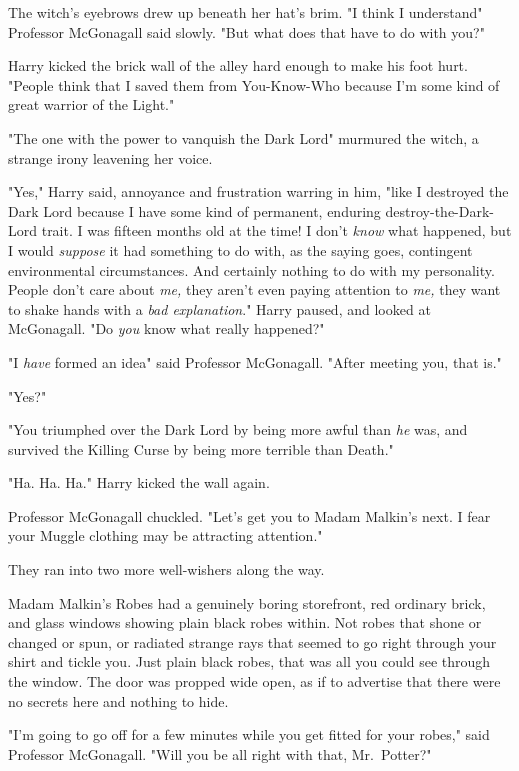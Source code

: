 The witch's eyebrows drew up beneath her hat's brim. "I think I
understand{\el}" Professor McGonagall said slowly. "But what does that have
to do with you?"

Harry kicked the brick wall of the alley hard enough to make his foot hurt.
"People think that I saved them from You-Know-Who because I'm some kind of
great warrior of the Light."

"The one with the power to vanquish the Dark Lord{\el}" murmured the witch,
a strange irony leavening her voice.

"Yes," Harry said, annoyance and frustration warring in him, "like I destroyed
the Dark Lord because I have some kind of permanent, enduring
destroy-the-Dark-Lord trait. I was fifteen months old at the time! I don't
\emph{know} what happened, but I would \emph{suppose} it had something to do
with, as the saying goes, contingent environmental circumstances. And certainly
nothing to do with my personality. People don't care about \emph{me,} they
aren't even paying attention to \emph{me,} they want to shake hands with a
\emph{bad explanation}." Harry paused, and looked at McGonagall. "Do \emph{you}
know what really happened?"

"I \emph{have} formed an idea{\el}" said Professor McGonagall. "After
meeting you, that is."

"Yes?"

"You triumphed over the Dark Lord by being more awful than \emph{he} was, and
survived the Killing Curse by being more terrible than Death."

"Ha. Ha. Ha." Harry kicked the wall again.

Professor McGonagall chuckled. "Let's get you to Madam Malkin's next. I fear
your Muggle clothing may be attracting attention."

They ran into two more well-wishers along the way.

Madam Malkin's Robes had a genuinely boring storefront, red ordinary brick, and
glass windows showing plain black robes within. Not robes that shone or changed
or spun, or radiated strange rays that seemed to go right through your shirt
and tickle you. Just plain black robes, that was all you could see through the
window. The door was propped wide open, as if to advertise that there were no
secrets here and nothing to hide.

"I'm going to go off for a few minutes while you get fitted for your robes,"
said Professor McGonagall. "Will you be all right with that, Mr.~Potter?"

